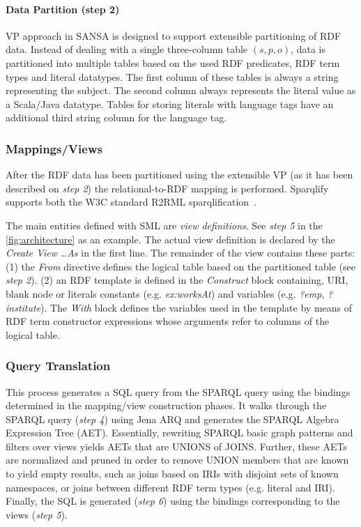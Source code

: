 \paragraph{Data Partition (step 2)}
VP approach in SANSA is designed to support extensible partitioning of RDF data.
Instead of dealing with a single three-column table $(s, p, o)$, data is partitioned into multiple tables based on the used RDF predicates, RDF term types and literal datatypes.
The first column of these tables is always a string representing the subject.
The second column always represents the literal value as a Scala/Java datatype.
Tables for storing literals with language tags have an additional third string column for the language tag.
\subsubsection{Mappings/Views}
After the RDF data has been partitioned using the extensible VP (as it has been described on \textit{step 2}) the relational-to-RDF mapping is performed.
Sparqlify supports both the W3C standard R2RML
sparqlification~\cite{sml}.

The main entities defined with SML are \textit{view definitions}.
See \textit{step 5} in the \autoref{fig:architecture} as an example.
The actual view definition is declared by the \emph{Create View} \ldots \emph{As} in the first line.
The remainder of the view contains these parts: (1) the \emph{From} directive defines the logical table based on the partitioned table (see \textit{step 2}).
(2) an RDF template is defined in the \emph{Construct} block containing, URI, blank node or literals constants (e.g. \emph{ex:worksAt}) and variables (e.g. \emph{?emp}, \emph{?institute}).
The \emph{With} block defines the variables used in the template by means of RDF term constructor expressions whose arguments refer to columns of the logical table.

\subsubsection{Query Translation}
This process generates a SQL query from the SPARQL query using the bindings determined in the mapping/view construction phases.
It walks through the SPARQL query (\textit{step 4}) using Jena ARQ and generates the SPARQL Algebra Expression Tree (AET). Essentially, rewriting SPARQL basic graph patterns and filters over views yields AETs that are UNIONS of JOINS.
Further, these AETs are normalized and pruned in order to remove UNION members that are known to yield empty results, such as joins based on IRIs with disjoint sets of known namespaces, or joins between different RDF term types (e.g. literal and IRI).
Finally, the SQL is generated (\textit{step 6}) using the bindings corresponding to the views (\textit{step 5}).

